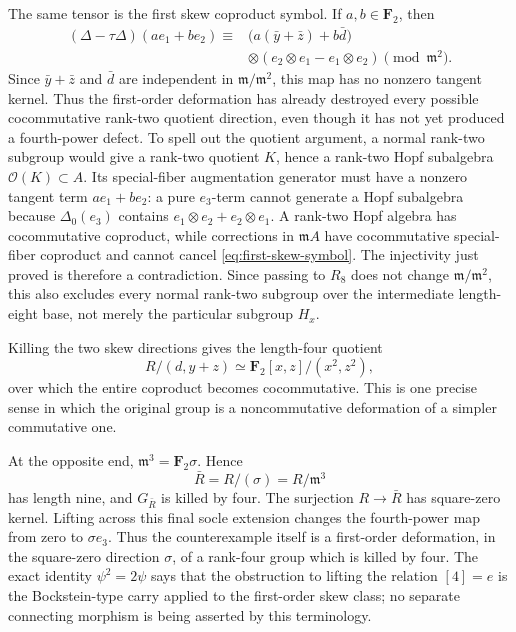 \documentclass[11pt]{article}
\theoremstyle{remark}
\newcommand{\F}{\mathbf F}
\newcommand{\m}{\mathfrak m}
\begin{document}
The same tensor is the first skew coproduct symbol.  If
\(a,b\in\F_2\), then
\begin{equation}\label{eq:first-skew-symbol}
\begin{split}
 (\Delta-\tau\Delta)(ae_1+be_2)
 \equiv{}&\bigl(a(\bar y+\bar z)+b\bar d\bigr)\\
 &\otimes(e_2\otimes e_1-e_1\otimes e_2)
 \pmod{\m^2}.
\end{split}
\end{equation}
Since \(\bar y+\bar z\) and \(\bar d\) are independent in
\(\m/\m^2\), this map has no nonzero tangent kernel.  Thus the first-order
deformation has already destroyed every possible cocommutative rank-two
quotient direction, even though it has not yet produced a fourth-power
defect.  To spell out the quotient argument, a normal rank-two subgroup
would give a rank-two quotient \(K\), hence a rank-two Hopf subalgebra
\(\mathcal O(K)\subset A\).  Its special-fiber augmentation generator must
have a nonzero tangent term \(ae_1+be_2\): a pure \(e_3\)-term cannot
generate a Hopf subalgebra because \(\Delta_0(e_3)\) contains
\(e_1\otimes e_2+e_2\otimes e_1\).  A rank-two Hopf algebra has
cocommutative coproduct, while corrections in \(\m A\) have cocommutative
special-fiber coproduct and cannot cancel \eqref{eq:first-skew-symbol}.
The injectivity just proved is therefore a contradiction.  Since passing to
\(R_8\) does not change \(\m/\m^2\), this also excludes every normal
rank-two subgroup over the intermediate length-eight base, not merely the
particular subgroup \(H_x\).

Killing the two skew directions gives the length-four quotient
\begin{equation}\label{eq:commutative-quotient}
 R/(d,y+z)\simeq\F_2[x,z]/(x^2,z^2),
\end{equation}
over which the entire coproduct becomes cocommutative.  This is one precise
sense in which the original group is a noncommutative deformation of a
simpler commutative one.

At the opposite end, \(\m^3=\F_2\sigma\).  Hence
\begin{equation}\label{eq:socle-reduction}
 \bar R=R/(\sigma)=R/\m^3
\end{equation}
has length nine, and \(G_{\bar R}\) is killed by four.  The surjection
\(R\to\bar R\) has square-zero kernel.  Lifting across this final socle
extension changes the fourth-power map from zero to
\(\sigma e_3\).  Thus the counterexample itself is a first-order
deformation, in the square-zero direction \(\sigma\), of a rank-four group
which is killed by four.  The exact identity \(\psi^2=2\psi\) says that the
obstruction to lifting the relation \([4]=e\) is the Bockstein-type carry
applied to the first-order skew class; no separate connecting morphism is
being asserted by this terminology.
\end{document}
